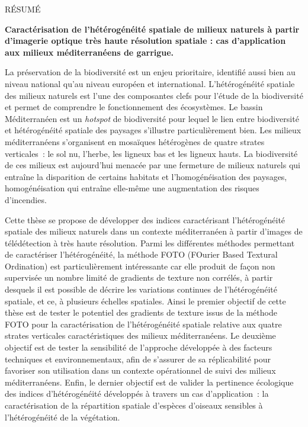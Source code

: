 {}
\small
{}
{\centerline {{\sffamily \Large RÉSUMÉ}}}

\textbf{Caractérisation de l’hétérogénéité spatiale de milieux naturels à partir d’imagerie optique très haute résolution spatiale : cas d’application aux milieux méditerranéens de garrigue.}

La préservation de la biodiversité est un enjeu prioritaire, identifié aussi bien au niveau national qu’au niveau européen et international. L’hétérogénéité spatiale des milieux naturels est l’une des composantes clefs pour l’étude de la biodiversité et permet de comprendre le fonctionnement des écosystèmes. Le bassin Méditerranéen est un \emph{hotspot} de biodiversité pour lequel le lien entre biodiversité et hétérogénéité spatiale des paysages s’illustre particulièrement bien. Les milieux méditerranéens s'organisent en mosaïques hétérogènes de quatre strates verticales~: le sol nu, l’herbe, les ligneux bas et les ligneux hauts. La biodiversité de ces milieux est aujourd'hui menacée par une fermeture de milieux naturels qui entraîne la disparition de certains habitats et l’homogénéisation des paysages, homogénéisation qui entraîne elle-même une augmentation des risques d’incendies.

Cette thèse se propose de développer des indices caractérisant l’hétérogénéité spatiale des milieux naturels dans un contexte méditerranéen à partir d’images de télédétection à très haute résolution. Parmi les différentes méthodes permettant de caractériser l'hétérogénéité, la méthode FOTO (FOurier Based Textural Ordination) est particulièrement intéressante car elle produit de façon non supervisée un nombre limité de gradients de texture non corrélés, à partir desquels il est possible de décrire les variations continues de l’hétérogénéité spatiale, et ce, à plusieurs échelles spatiales. Ainsi le premier objectif de cette thèse est de tester le potentiel des gradients de texture issus de la méthode FOTO pour la caractérisation de l’hétérogénéité spatiale relative aux quatre strates verticales caractéristiques des milieux méditerranéens. Le deuxième objectif est de tester la sensibilité de l’approche développée à des facteurs techniques et environnementaux, afin de s’assurer de sa réplicabilité pour favoriser son utilisation dans un contexte opérationnel de suivi des milieux méditerranéens. Enfin, le dernier objectif est de valider la pertinence écologique des indices d’hétérogénéité développés à travers un cas d’application~: la caractérisation de la répartition spatiale d’espèces d’oiseaux sensibles à l’hétérogénéité de la végétation.


